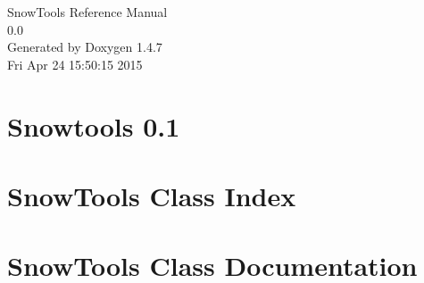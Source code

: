 \documentclass[a4paper]{book}
\begin{document}
\begin{titlepage}
\vspace*{7cm}
\begin{center}
{\Large Snow\-Tools Reference Manual\\[1ex]\large 0.0 }\\
\vspace*{1cm}
{\large Generated by Doxygen 1.4.7}\\
\vspace*{0.5cm}
{\small Fri Apr 24 15:50:15 2015}\\
\end{center}
\end{titlepage}
\clearemptydoublepage
{}
\tableofcontents
\clearemptydoublepage
{}
\chapter{Snowtools 0.1 }
\label{index}
\chapter{Snow\-Tools Class Index}

\chapter{Snow\-Tools Class Documentation}







\printindex
\end{document}
